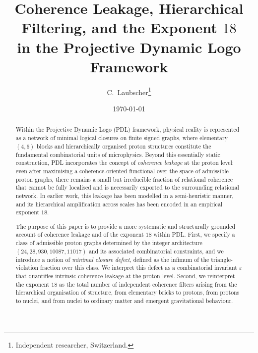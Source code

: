 \documentclass[11pt,a4paper]{article}
\theoremstyle{definition}
\begin{document}
\title{Coherence Leakage, Hierarchical Filtering, and the Exponent $18$\\
in the Projective Dynamic Logo Framework}

\author{C.~Laubscher\thanks{Independent researcher, Switzerland.}\\[4pt]}

\date{\small \today}

\maketitle

\begin{abstract}
Within the Projective Dynamic Logo (PDL) framework, physical reality is represented as a network of minimal logical closures on finite signed graphs, where elementary $(4,6)$ blocks and hierarchically organised proton structures constitute the fundamental combinatorial units of microphysics.\cite{PDL_Main_2026,PDL_Intro_2026,Combinatorial_Proton_v2_2026,PDL_Global_Mapping_2026} Beyond this essentially static construction, PDL incorporates the concept of \emph{coherence leakage} at the proton level: even after maximising a coherence-oriented functional over the space of admissible proton graphs, there remains a small but irreducible fraction of relational coherence that cannot be fully localised and is necessarily exported to the surrounding relational network.\cite{Exponent_18_PDL_2026,Topological_Reformulation_PDL_2026} In earlier work, this leakage has been modelled in a semi-heuristic manner, and its hierarchical amplification across scales has been encoded in an empirical exponent $18$.

The purpose of this paper is to provide a more systematic and structurally grounded account of coherence leakage and of the exponent $18$ within PDL. First, we specify a class of admissible proton graphs determined by the integer architecture $(24,28,930,10087,11017)$ and its associated combinatorial constraints, and we introduce a notion of \emph{minimal closure defect}, defined as the infimum of the triangle-violation fraction over this class.\cite{Combinatorial_Proton_v2_2026,PDL_Global_Mapping_2026} We interpret this defect as a combinatorial invariant $\varepsilon$ that quantifies intrinsic coherence leakage at the proton level. Second, we reinterpret the exponent $18$ as the total number of independent coherence filters arising from the hierarchical organisation of structure, from elementary bricks to protons, from protons to nuclei, and from nuclei to ordinary matter and emergent gravitational behaviour.\cite{Exponent_18_PDL_2026}


\end{abstract}
\end{document}
